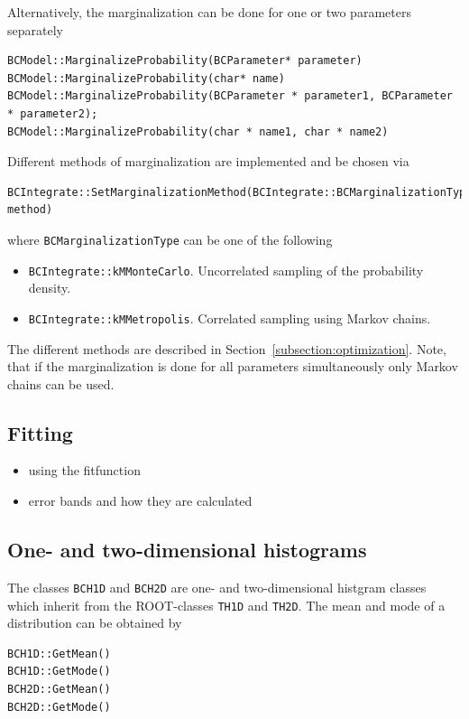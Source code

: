 \documentclass[11pt, a4paper]{article}
\begin{document}
\noindent 
Alternatively, the marginalization can be done for one or two
parameters separately
%
\begin{verbatim}
BCModel::MarginalizeProbability(BCParameter* parameter)
BCModel::MarginalizeProbability(char* name) 
BCModel::MarginalizeProbability(BCParameter * parameter1, BCParameter * parameter2);
BCModel::MarginalizeProbability(char * name1, char * name2)
\end{verbatim} 

\noindent 
Different methods of marginalization are implemented and be chosen via
%
\begin{verbatim}
BCIntegrate::SetMarginalizationMethod(BCIntegrate::BCMarginalizationType method)
\end{verbatim} 

\noindent
where \verb|BCMarginalizationType| can be one of the following 
% 
\begin{itemize}
\item \verb|BCIntegrate::kMMonteCarlo|. Uncorrelated sampling of the
 probability density.  
\item \verb|BCIntegrate::kMMetropolis|. Correlated sampling using
 Markov chains.
\end{itemize} 

\noindent 
The different methods are described in
Section~\ref{subsection:optimization}. Note, that if the
marginalization is done for all parameters simultaneously only Markov
chains can be used. \\


\subsection{Fitting} 

\begin{itemize}
\item using the fitfunction 
\item error bands and how they are calculated 
\end{itemize}


\subsection{One- and two-dimensional histograms} 

The classes \verb|BCH1D| and \verb|BCH2D| are one- and two-dimensional
histgram classes which inherit from the ROOT-classes \verb|TH1D| and
\verb|TH2D|. The mean and mode of a distribution can be obtained by 
%
\begin{verbatim}
BCH1D::GetMean()
BCH1D::GetMode()
BCH2D::GetMean()
BCH2D::GetMode()
\end{verbatim} 
\end{document}
